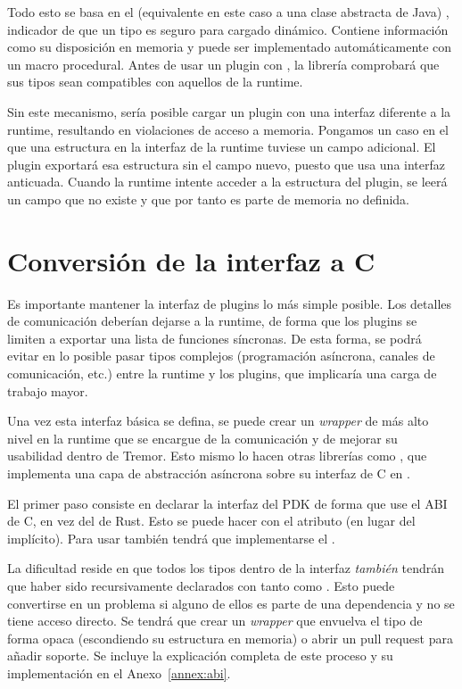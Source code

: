 Todo esto se basa en el \trait (equivalente en este caso a una clase abstracta
de Java) , indicador de que un tipo es seguro para cargado
dinámico. Contiene información como su disposición en memoria y puede ser
implementado automáticamente con un macro procedural. Antes de usar un plugin
con \abistable, la librería comprobará que sus tipos sean compatibles con
aquellos de la runtime.

Sin este mecanismo, sería posible cargar un plugin con una interfaz diferente a
la runtime, resultando en violaciones de acceso a memoria. Pongamos un caso en
el que una estructura en la interfaz de la runtime tuviese un campo adicional.
El plugin exportará esa estructura sin el campo nuevo, puesto que usa una
interfaz anticuada. Cuando la runtime intente acceder a la estructura del
plugin, se leerá un campo que no existe y que por tanto es parte de memoria no
definida.

\section{Conversión de la interfaz a C}

Es importante mantener la interfaz de plugins lo más simple posible. Los
detalles de comunicación deberían dejarse a la runtime, de forma que los plugins
se limiten a exportar una lista de funciones síncronas. De esta forma, se podrá
evitar en lo posible pasar tipos complejos (programación asíncrona, canales de
comunicación, etc.) entre la runtime y los plugins, que implicaría una carga de
trabajo mayor.

Una vez esta interfaz básica se defina, se puede crear un \emph{wrapper} de más
alto nivel en la runtime que se encargue de la comunicación y de mejorar su
usabilidad dentro de Tremor. Esto mismo lo hacen otras librerías como
, que implementa una capa de abstracción asíncrona sobre su
interfaz de C en .

El primer paso consiste en declarar la interfaz del PDK de forma que use el ABI
de C, en vez del de Rust. Esto se puede hacer con el atributo \rust{#[repr(C)]}
(en lugar del  implícito). Para usar \abistable también
tendrá que implementarse el \trait {}.

La dificultad reside en que todos los tipos dentro de la interfaz \emph{también}
tendrán que haber sido recursivamente declarados con tanto \rust{#[repr(C)]}
como . Esto puede convertirse en un problema si alguno de ellos
es parte de una dependencia y no se tiene acceso directo. Se tendrá que crear un
\emph{wrapper} que envuelva el tipo de forma opaca (escondiendo su estructura en
memoria) o abrir un pull request para añadir soporte. Se incluye la explicación
completa de este proceso y su implementación en el Anexo~\ref{annex:abi}.

